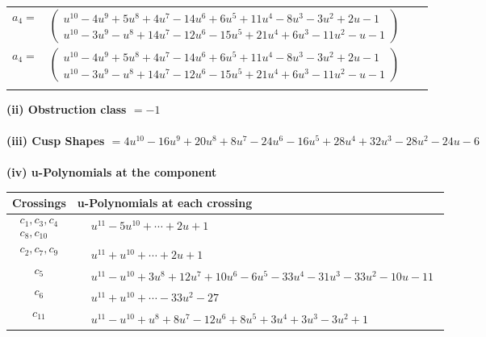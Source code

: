 \documentclass[1p]{elsarticle_modified}
\theoremstyle{definition}
\begin{document}
\begin{tabular}{m{7pt} m{180pt} m{7pt} m{180pt} }
\flushright $a_{4}=$&$\begin{pmatrix}u^{10}-4 u^9+5 u^8+4 u^7-14 u^6+6 u^5+11 u^4-8 u^3-3 u^2+2 u-1\\u^{10}-3 u^9- u^8+14 u^7-12 u^6-15 u^5+21 u^4+6 u^3-11 u^2- u-1\end{pmatrix}$\\ \flushright $a_{4}=$&$\begin{pmatrix}u^{10}-4 u^9+5 u^8+4 u^7-14 u^6+6 u^5+11 u^4-8 u^3-3 u^2+2 u-1\\u^{10}-3 u^9- u^8+14 u^7-12 u^6-15 u^5+21 u^4+6 u^3-11 u^2- u-1\end{pmatrix}$\\&\end{tabular}
\flushleft \textbf{(ii) Obstruction class $= -1$}\\~\\
\flushleft \textbf{(iii) Cusp Shapes $= 4 u^{10}-16 u^9+20 u^8+8 u^7-24 u^6-16 u^5+28 u^4+32 u^3-28 u^2-24 u-6$}\\~\\
\newpage\renewcommand{\arraystretch}{1}
\flushleft \textbf{(iv) u-Polynomials at the component}\newline \\
\begin{tabular}{m{50pt}|m{274pt}}
Crossings & \hspace{64pt}u-Polynomials at each crossing \\
\hline $$\begin{aligned}c_{1},c_{3},c_{4}\\c_{8},c_{10}\end{aligned}$$&$\begin{aligned}
&u^{11}-5 u^{10}+\cdots+2 u+1
\end{aligned}$\\
\hline $$\begin{aligned}c_{2},c_{7},c_{9}\end{aligned}$$&$\begin{aligned}
&u^{11}+u^{10}+\cdots+2 u+1
\end{aligned}$\\
\hline $$\begin{aligned}c_{5}\end{aligned}$$&$\begin{aligned}
&u^{11}- u^{10}+3 u^8+12 u^7+10 u^6-6 u^5-33 u^4-31 u^3-33 u^2-10 u-11
\end{aligned}$\\
\hline $$\begin{aligned}c_{6}\end{aligned}$$&$\begin{aligned}
&u^{11}+u^{10}+\cdots-33 u^2-27
\end{aligned}$\\
\hline $$\begin{aligned}c_{11}\end{aligned}$$&$\begin{aligned}
&u^{11}- u^{10}+u^8+8 u^7-12 u^6+8 u^5+3 u^4+3 u^3-3 u^2+1
\end{aligned}$\\
\hline
\end{tabular}\\~\\
\end{document}
